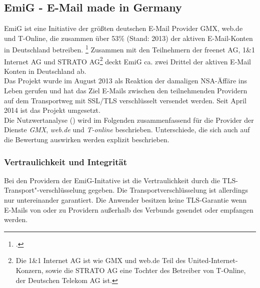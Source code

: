 \documentclass  [paper=a4,
				fontsize=12pt,
				listof=totoc,
				bibliography=totoc
				]{scrreprt}
\begin{document}
			\subsection{EmiG - E-Mail made in Germany}
			EmiG ist eine Initiative der größten deutschen E-Mail Provider GMX, web.de und T-Online, die zusammen über 53\% (Stand: 2013) der aktiven E-Mail-Konten in Deutschland betreiben.
			\footcite[Vgl.][]{Brandt13} 
			Zusammen mit den Teilnehmern der freenet AG, 1\&1 Internet AG und STRATO AG\footnote{Die 1\&1 Internet AG ist wie GMX und web.de Teil des United-Internet-Konzern, sowie die STRATO AG eine Tochter des Betreiber von T-Online, der Deutschen Telekom AG ist.} deckt EmiG ca. zwei Drittel der aktiven E-Mail Konten in Deutschland ab.\\
			Das Projekt wurde im August 2013 als Reaktion der damaligen NSA-Äffäre ins Leben gerufen und hat das Ziel E-Mails zwischen den teilnehmenden Providern auf dem Transportweg mit SSL/TLS verschlüsselt versendet werden.
			Seit April 2014 ist das Projekt umgesetzt.
			\medskip\\
			Die Nutzwertanalyse () wird im Folgenden zusammenfassend für die Provider der Dienste \textit{GMX}, \textit{web.de} und \textit{T-online} beschrieben. 
			Unterschiede, die sich auch auf die Bewertung auswirken werden explizit beschrieben.
		\subsubsection{Vertraulichkeit und Integrität}		
			Bei den Providern der EmiG-Initative ist die Vertraulichkeit durch die TLS-Transport"-verschlüsselung gegeben. 
			Die Transportverschlüsselung ist allerdings nur untereinander garantiert. 
			Die Anwender besitzen keine TLS-Garantie wenn E-Mails von oder zu Providern außerhalb des Verbunds gesendet oder empfangen werden.\\
\end{document}
